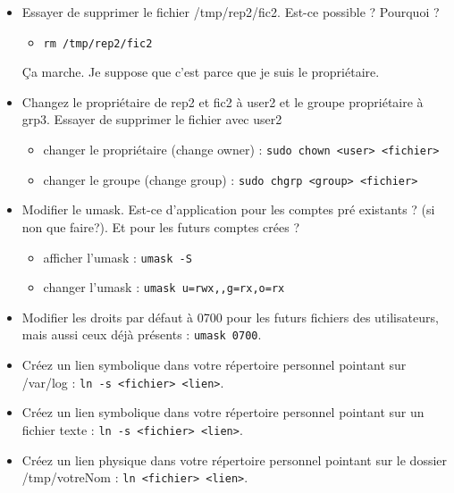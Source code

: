 \documentclass[a4paper]{article}
\begin{document}
\begin{itemize}
\item Essayer de supprimer le fichier /tmp/rep2/fic2. Est-ce possible ? Pourquoi ?
\begin{example}
    \begin{itemize}
        \item \texttt{rm /tmp/rep2/fic2}
    \end{itemize}
    Ça marche. Je suppose que c'est parce que je suis le propriétaire.
\end{example}

\item Changez le propriétaire de rep2 et fic2 à user2 et le groupe propriétaire à grp3. Essayer de supprimer le fichier avec user2
\begin{example}
    \begin{itemize}
        \item changer le propriétaire (change owner) : \texttt{sudo chown <user> <fichier>}
        \item changer le groupe (change group) : \texttt{sudo chgrp <group> <fichier>}
    \end{itemize}
\end{example}

\item Modifier le umask. Est-ce d'application pour les comptes pré existants ? (si non que faire?). Et pour les futurs comptes crées ?
\begin{example}
    \begin{itemize}
        \item afficher l'umask : \texttt{umask -S}
        \item changer l'umask : \texttt{umask u=rwx,,g=rx,o=rx}
    \end{itemize}
\end{example}

\item Modifier les droits par défaut à 0700 pour les futurs fichiers des utilisateurs, mais aussi ceux déjà présents : \texttt{umask 0700}.

\item Créez un lien symbolique dans votre répertoire personnel pointant sur /var/log : \texttt{ln -s <fichier> <lien>}.

\item Créez un lien symbolique dans votre répertoire personnel pointant sur un fichier texte : \texttt{ln -s <fichier> <lien>}.

\item Créez un lien physique dans votre répertoire personnel pointant sur le dossier /tmp/votreNom : \texttt{ln <fichier> <lien>}.

\end{itemize}
\end{document}
